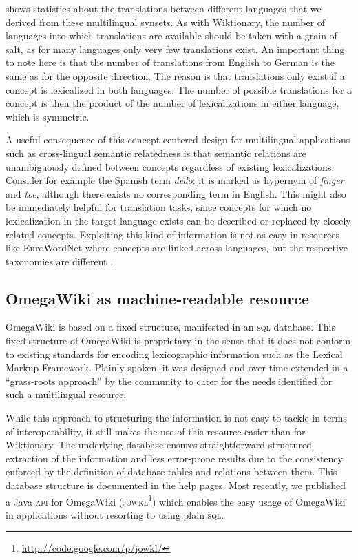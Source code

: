 \documentclass[output=paper]{LSP/langsci}
\begin{document}
 shows statistics about the translations between different languages that we derived from these multilingual synsets. As with Wiktionary, the number of languages into which translations are available should be taken with a grain of salt, as for many languages only very few translations exist. An important thing to note here is that the number of translations from English to German is the same as for the opposite direction. The reason is that translations only exist if a concept is lexicalized in both languages. The number of possible translations for a concept is then the product of the number of lexicalizations in either language, which is symmetric.

 A useful consequence of this concept-centered design for multilingual applications such as cross-lingual semantic relatedness is that semantic relations are unambiguously defined between concepts regardless of existing lexicalizations. Consider for example the Spanish term \textit{dedo}: it is marked as hypernym of \textit{finger} and \textit{toe}, although there exists no corresponding term in English. This might also be immediately helpful for translation tasks, since concepts for which no lexicalization in the target language exists can be described or replaced by closely related concepts. Exploiting this kind of information is not as easy in resources like EuroWordNet where concepts are linked across languages, but the respective taxonomies are different \citep{Jansen2004}. 

\subsection{OmegaWiki as machine-readable resource}
OmegaWiki is based on a fixed structure, manifested in an \textsc{sql} database. This fixed structure of OmegaWiki is proprietary in the sense that it does not conform to existing standards for encoding lexicographic information such as the Lexical Markup Framework. Plainly spoken, it was designed and over time extended in a ``grass-roots approach'' by the community to cater for the needs identified for such a multilingual resource.

While this approach to structuring the information is not easy to tackle in terms of interoperability, it still makes the use of this resource easier than for Wiktionary. The underlying database ensures straightforward structured extraction of the information and less error-prone results due to the consistency enforced by the definition of database tables and relations between them. This database structure is documented in the help pages. Most recently, we published a Java \textsc{api} for OmegaWiki (\textsc{jowkl}\footnote{\url{http://code.google.com/p/jowkl/}}) which enables the easy usage of OmegaWiki in applications without resorting to using plain \textsc{sql}. 
\end{document}
